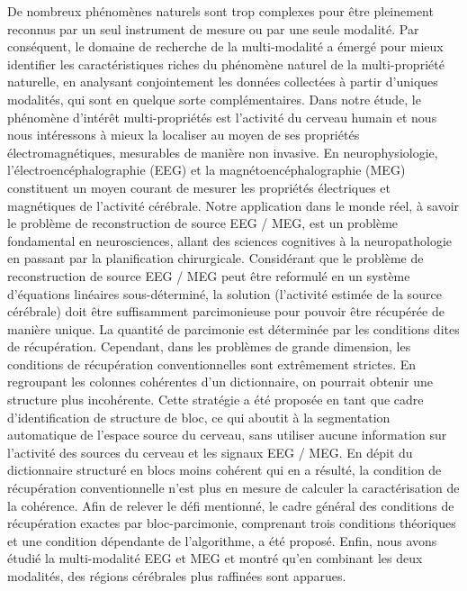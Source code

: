 De nombreux phénomènes naturels sont trop complexes pour être pleinement reconnus par un seul instrument de mesure ou par une seule modalité. 
    Par conséquent, le domaine de recherche de la multi-modalité a émergé pour mieux identifier les caractéristiques riches du phénomène naturel de la multi-propriété naturelle, en analysant conjointement les données collectées à partir d’uniques modalités, qui sont en quelque sorte complémentaires.
    Dans notre étude, le phénomène d'intérêt multi-propriétés est l'activité du cerveau humain et nous nous intéressons à mieux la localiser au moyen de ses propriétés électromagnétiques, mesurables de manière non invasive.
    En neurophysiologie, l'électroencéphalographie (EEG) et la magnétoencéphalographie (MEG) constituent un moyen courant de mesurer les propriétés électriques et magnétiques de l'activité cérébrale. 
    Notre application dans le monde réel, à savoir le problème de reconstruction de source EEG / MEG, est un problème fondamental en neurosciences, allant des sciences cognitives à la neuropathologie en passant par la planification chirurgicale.
Considérant que le problème de reconstruction de source EEG / MEG peut être reformulé en un système d'équations linéaires sous-déterminé, la solution (l'activité estimée de la source cérébrale) doit être suffisamment parcimonieuse pour pouvoir être récupérée de manière unique. 
La quantité de parcimonie est déterminée par les conditions dites de récupération. 
Cependant, dans les problèmes de grande dimension, les conditions de récupération conventionnelles sont extrêmement strictes. 
En regroupant les colonnes cohérentes d'un dictionnaire, on pourrait obtenir une structure plus incohérente. 
Cette stratégie a été proposée en tant que cadre d’identification de structure de bloc, ce qui aboutit à la segmentation automatique de l’espace source du cerveau, sans utiliser aucune information sur l’activité des sources du cerveau et les signaux EEG / MEG. 
En dépit du dictionnaire structuré en blocs moins cohérent qui en a résulté, la condition de récupération conventionnelle n’est plus en mesure de calculer la caractérisation de la cohérence. 
Afin de relever le défi mentionné, le cadre général des conditions de récupération exactes par bloc-parcimonie, comprenant trois conditions théoriques et une condition dépendante de l'algorithme, a été proposé. 
Enfin, nous avons étudié la multi-modalité EEG et MEG et montré qu'en combinant les deux modalités, des régions cérébrales plus raffinées sont apparues.
